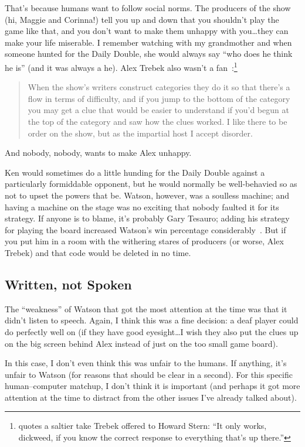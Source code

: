 That's because humans want to follow social norms.
%
The producers of the show (hi, Maggie and Corinna!) tell you up and
down that you shouldn't play the game like that, and you don't want to
make them unhappy with you\dots they can make your life miserable.
%
I remember watching \jeopardy{} with my grandmother and when someone
hunted for the Daily Double, she would always say ``who does he think
he is'' (and it was always a he).
%
Alex Trebek also wasn't a
fan~\citep{marchese-18}:\footnote{\citet{rogak-20} quotes a saltier
  take Trebek offered to Howard Stern: ``It only works, dickweed, if
  you know the correct response to everything that's up there.''}
%
\begin{quote}
  When the show's writers construct categories they do it so that
  there's a flow in terms of difficulty, and if you jump to the bottom
  of the category you may get a clue that would be easier to
  understand if you'd begun at the top of the category and saw how the
  clues worked. I like there to be order on the show, but as the
  impartial host I accept disorder.
\end{quote}
%
And nobody, nobody, wants to make Alex unhappy.

Ken would sometimes do a little hunding for the Daily Double against a
particularly formiddable opponent, but he would normally be
well-behavied so as not to upset the powers that be.
%
Watson, however, was a soulless machine; and having a machine on the
stage was no exciting that
nobody faulted it for its strategy.
%
If anyone is to blame, it's probably Gary Tesauro; adding his
strategy for playing the board increased Watson's win percentage
considerably~\citep{tesauro-13}.
%
But if you put him in a room with the withering stares of \jeopardy{}
producers (or worse, Alex Trebek) and that code would be deleted in no
time.

\subsection{Written, not Spoken}

The ``weakness'' of Watson that got the most attention at the time was
that it didn't listen to speech.
%
Again, I think this was a fine decision: a deaf player could do
perfectly well on \jeopardy{} (if they have good eyesight\dots I
wish they also put the clues up on the big screen behind Alex
instead of just on the too small game board).

In this case, I don't even think this was unfair to the humans.
%
If anything, it's unfair to Watson (for reasons that should be clear
in a second).
%
For this specific human--computer matchup, I don't think it is
important (and perhaps it got more attention at the time to distract from the
other issues I've already talked about).

